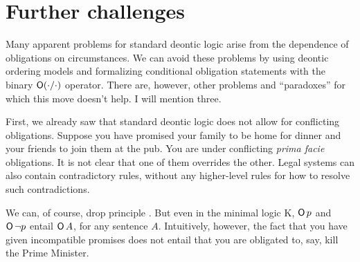 


  
\section{Further challenges}

Many apparent problems for standard deontic logic arise from the dependence of
obligations on circumstances. We can avoid these problems by using deontic
ordering models and formalizing conditional obligation statements with the
binary $\operatorname{\mathsf{O}}(\cdot/\cdot)$ operator. There are, however, other problems and
``paradoxes'' for which this move doesn't help. I will mention three.

First, we already saw that standard deontic logic does not allow for conflicting
obligations. Suppose you have promised your family to be home for dinner and
your friends to join them at the pub. You are under conflicting \emph{prima
  facie} obligations. It is not clear that one of them overrides the other.
Legal systems can also contain contradictory rules, without any higher-level
rules for how to resolve such contradictions.

We can, of course, drop principle . But even in the minimal logic K,
$\operatorname{\mathsf{O}} p$ and $\operatorname{\mathsf{O}} \neg p$ entail $\operatorname{\mathsf{O}} A$, for any sentence $A$. Intuitively,
however, the fact that you have given incompatible promises does not entail that
you are obligated to, say, kill the Prime Minister.


